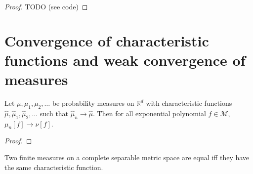\begin{proof}
\leanok
TODO (see code)
\end{proof}




\section{Convergence of characteristic functions and weak convergence of measures}


\begin{lemma}\label{lem:tendsto_M_of_tendsto_charFun}
\leanok
{}
Let $\mu, \mu_1, \mu_2, \ldots$ be probability measures on $\mathbb{R}^d$ with characteristic functions $\hat{\mu}, \hat{\mu}_1, \hat{\mu}_2, \ldots$ such that $\hat{\mu}_n \to \hat{\mu}$.
Then for all exponential polynomial $f \in \mathcal M$, $\mu_n[f] \to \nu[f]$.
\end{lemma}

\begin{proof}\leanok
\end{proof}


\begin{lemma}\label{lem:ext_charFun}
\leanok
{}
Two finite measures on a complete separable metric space are equal iff they have the same characteristic function.
\end{lemma}

